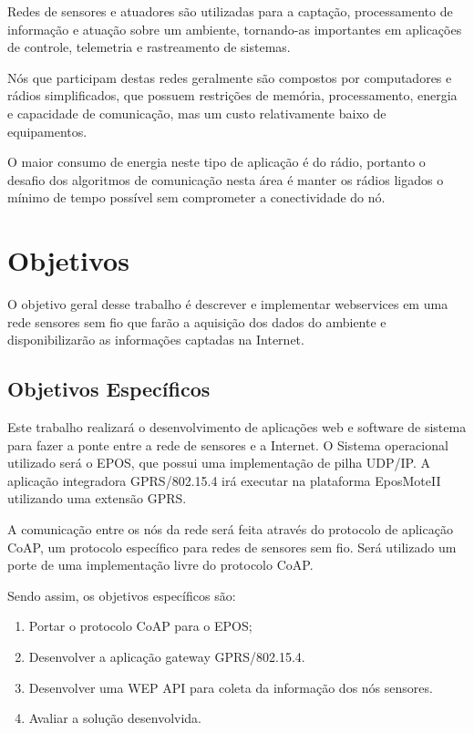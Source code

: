 Redes de sensores e atuadores s\~ao utilizadas para a capta\c{c}\~ao, processamento de informa\c{c}\~ao e atua\c{c}\~ao sobre um ambiente, tornando-as importantes em aplica\c{c}\~oes de controle, telemetria e rastreamento de sistemas.

N\'os que participam destas redes geralmente s\~ao compostos por computadores e r\'adios simplificados, que possuem restri\c{c}\~oes de mem\'oria, processamento, energia e capacidade de comunica\c{c}\~ao, mas um custo relativamente baixo de equipamentos.

O maior consumo de energia neste tipo de aplica\c{c}\~ao \'e do r\'adio, portanto o desafio dos algoritmos de comunica\c{c}\~ao nesta \'area \'e manter os r\'adios ligados o m\'inimo de tempo poss\'ivel sem comprometer a conectividade do n\'o.

\section{Objetivos}
O objetivo geral desse trabalho \'e descrever e implementar webservices em uma rede sensores sem fio que far\~ao a aquisi\c{c}\~ao dos dados do ambiente e disponibilizar\~ao as informa\c{c}\~oes captadas na Internet.

\subsection{Objetivos Espec\'ificos}
Este trabalho realizar\'a o desenvolvimento de aplica\c{c}\~oes web e software de sistema para fazer a ponte entre a rede de sensores e a Internet. O Sistema operacional utilizado ser\'a o EPOS, que possui uma implementa\c{c}\~ao de pilha UDP/IP. A aplica\c{c}\~ao integradora GPRS/802.15.4 ir\'a executar na plataforma EposMoteII utilizando uma extens\~ao GPRS.

A comunica\c{c}\~ao entre os n\'os da rede ser\'a feita atrav\'es do protocolo de aplica\c{c}\~ao CoAP, um protocolo espec\'ifico para redes de sensores sem fio. Ser\'a utilizado um porte de uma implementa\c{c}\~ao livre do protocolo CoAP.

Sendo assim, os objetivos espec\'ificos s\~ao:

\begin{enumerate}
    \item{Portar o protocolo CoAP para o EPOS;}
    \item{Desenvolver a aplica\c{c}\~ao gateway GPRS/802.15.4.}
    \item{Desenvolver uma WEP API para coleta da informa\c{c}\~ao dos n\'os sensores.}
    \item{Avaliar a solu\c{c}\~ao desenvolvida.}
\end{enumerate}

